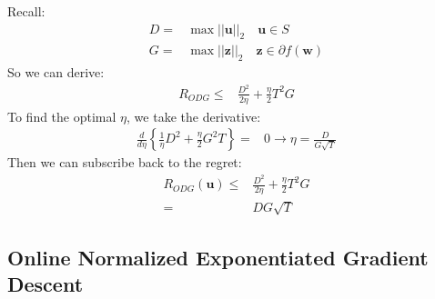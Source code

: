 \documentclass[11pt]{article}
\newcommand{\bz}{\boldsymbol{z}}
\newcommand{\bw}{\boldsymbol{w}}
\newcommand{\bu}{\boldsymbol{u}}
\begin{document}
Recall:
\begin{align}
    D = &\max ||\bu||_2 \quad \bu\in S \nonumber\\
    G = &\max ||\bz||_2 \quad \bz\in \partial f(\bw) \nonumber
\end{align}
%
So we can derive:
\begin{align}
    R_{ODG} \leq & \frac{D^2}{2 \eta} + \frac{\eta}{2} T^2 G \nonumber
\end{align}
%
To find the optimal $\eta$, we take the derivative:
\begin{align}
    \frac{d}{d \eta} \left\{ \frac{1}{\eta} D^2 + \frac{\eta}{2} G^2T \right\} = & 0  \rightarrow \eta = \frac{D}{G \sqrt{T}} \nonumber
\end{align}
%
Then we can subscribe back to the regret:
\begin{align}
    R_{ODG} (\bu) \leq & \frac{D^2}{2 \eta} + \frac{\eta}{2} T^2 G \nonumber \\
    = & DG \sqrt{T} \nonumber
\end{align}
%
\subsection{Online Normalized Exponentiated
Gradient Descent}
\end{document}
